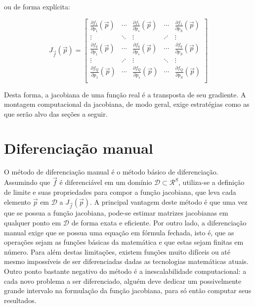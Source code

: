   \noindent ou de forma explícita:

    \begin{equation} \label{e:jacobiana_definicao_explicita}
      J_{\vec{f}}(\vec{p}) =
      \begin{bmatrix}
        \frac{\partial f_1}{\partial p_1}(\vec{p}) & \cdots & \frac{\partial f_1}{\partial p_s}(\vec{p}) & \cdots & \frac{\partial f_1}{\partial p_S}(\vec{p}) \\
        \vdots& \ddots& \vdots &\iddots &\vdots  \\
        \frac{\partial f_q}{\partial p_1}(\vec{p}) & \cdots & \frac{\partial f_q}{\partial p_s}(\vec{p}) & \cdots & \frac{\partial f_q}{\partial p_S}(\vec{p}) \\
        \vdots& \iddots& \vdots &\ddots &\vdots  \\
        \frac{\partial f_Q}{\partial p_1}(\vec{p}) & \cdots & \frac{\partial f_Q}{\partial p_s}(\vec{p}) & \cdots & \frac{\partial f_Q}{\partial p_S}(\vec{p}) \\
      \end{bmatrix}
    \end{equation}

  Desta forma, a jacobiana de uma função real é a transposta de seu gradiente. A montagem computacional da jacobiana, de modo geral, exige estratégias como as que serão alvo das seções a seguir.

  \section{Diferenciação manual}

    O método de diferenciação manual é o método básico de diferenciação. Assumindo que $\vec{f}$ é diferenciável em um domínio $\mathcal{D} \subset \mathcal{R}^S$, utiliza-se a definição de limite e suas propriedades para compor a função jacobiana, que leva cada elemento $\vec{p}$ em $\mathcal{D}$ a $J_{\vec{f}}(\vec{p})$. A principal vantagem deste método é que uma vez que se possua a função jacobiana, pode-se estimar matrizes jacobianas em qualquer ponto em $\mathcal{D}$ de forma exata e eficiente. Por outro lado, a diferenciação manual exige que se possua uma equação em fórmula fechada, isto é, que as operações sejam as funções básicas da matemática e que estas sejam finitas em número. Para além destas limitações, existem funções muito difíceis ou até mesmo impossíveis de ser diferenciadas dadas as tecnologias matemáticas atuais. Outro ponto bastante negativo do método é a inescalabilidade computacional: a cada novo problema a ser diferenciado, alguém deve dedicar um possivelmente grande intervalo na formulação da função jacobiana, para só então computar seus resultados.

